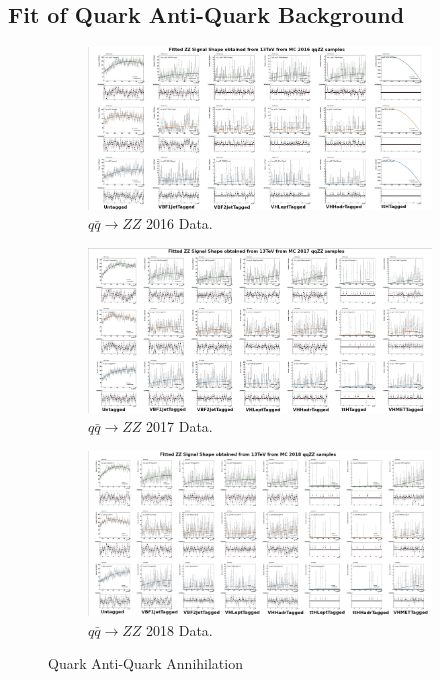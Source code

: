 \subsection{Fit of Quark Anti-Quark Background}

\begin{figure}[h]
\vspace*{-8mm}
    \centering
    \begin{subfigure}[b]{0.75\textwidth}
    \includegraphics[scale=0.6]{images/2016qq.jpg}
    \caption{$q \bar{q} \rightarrow ZZ$ 2016 Data.}
\end{subfigure}
\vfill
\begin{subfigure}[b]{0.75\textwidth}
    \includegraphics[scale=0.6]{images/2017qq.jpg}
    \caption{$q \bar{q} \rightarrow ZZ$ 2017 Data.}
\end{subfigure}
\vfill
\begin{subfigure}[b]{0.75\textwidth}
    \includegraphics[scale=0.6]{images/2018qq.jpg}
    \caption{$q \bar{q} \rightarrow ZZ$ 2018 Data.}
\end{subfigure}
\caption{Quark Anti-Quark Annihilation}
\vspace*{-5mm}
\end{figure}